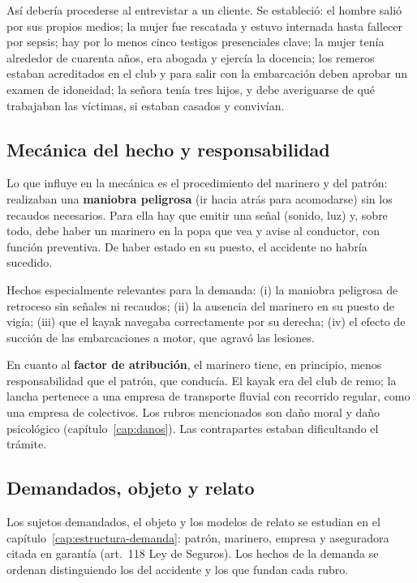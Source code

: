 \documentclass[12pt,oneside]{book}
\begin{document}
Así debería procederse al entrevistar a un cliente. Se estableció: el hombre salió por sus propios medios; la mujer fue rescatada y estuvo internada hasta fallecer por sepsis; hay por lo menos cinco testigos presenciales clave; la mujer tenía alrededor de cuarenta años, era abogada y ejercía la docencia; los remeros estaban acreditados en el club y para salir con la embarcación deben aprobar un examen de idoneidad; la señora tenía tres hijos, y debe averiguarse de qué trabajaban las víctimas, si estaban casados y convivían.

\subsection{Mecánica del hecho y responsabilidad}

Lo que influye en la mecánica es el procedimiento del marinero y del patrón: realizaban una \textbf{maniobra peligrosa} (ir hacia atrás para acomodarse) sin los recaudos necesarios. Para ella hay que emitir una señal (sonido, luz) y, sobre todo, debe haber un marinero en la popa que vea y avise al conductor, con función preventiva. De haber estado en su puesto, el accidente no habría sucedido.

\begin{importante}
Hechos especialmente relevantes para la demanda: (i) la maniobra peligrosa de retroceso sin señales ni recaudos; (ii) la ausencia del marinero en su puesto de vigía; (iii) que el kayak navegaba correctamente por su derecha; (iv) el efecto de succión de las embarcaciones a motor, que agravó las lesiones.
\end{importante}

En cuanto al \textbf{factor de atribución}, el marinero tiene, en principio, menos responsabilidad que el patrón, que conducía. El kayak era del club de remo; la lancha pertenece a una empresa de transporte fluvial con recorrido regular, como una empresa de colectivos. Los rubros mencionados son daño moral y daño psicológico (capítulo~\ref{cap:danos}). Las contrapartes estaban dificultando el trámite.

\subsection{Demandados, objeto y relato}

Los sujetos demandados, el objeto y los modelos de relato se estudian en el capítulo~\ref{cap:estructura-demanda}: patrón, marinero, empresa y aseguradora citada en garantía (art.~118 Ley de Seguros). Los hechos de la demanda se ordenan distinguiendo los del accidente y los que fundan cada rubro.
\end{document}
